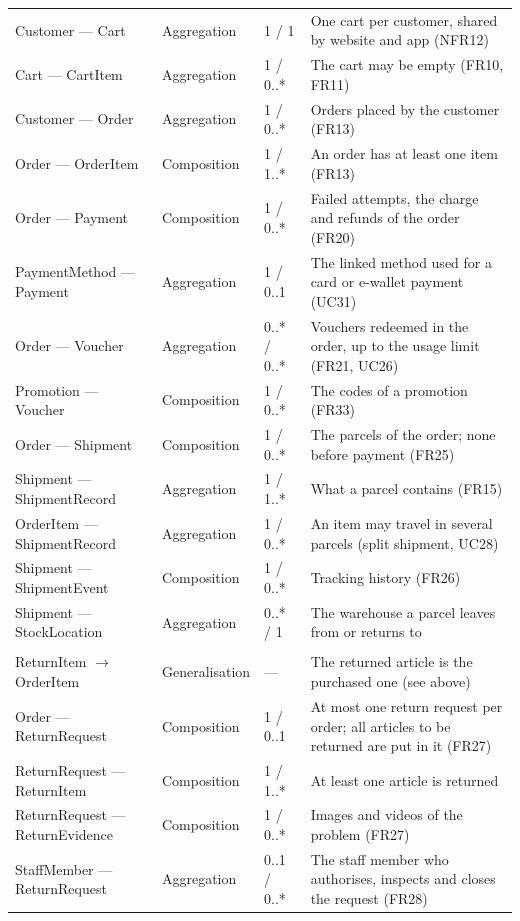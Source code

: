 {\begin{xltabular}{\textwidth}{@{}L{4.4cm} L{2.1cm} L{1.7cm} Y@{}}
Customer --- Cart & Aggregation & 1 / 1 & One cart per customer, shared by website and app (NFR12) \\
Cart --- CartItem & Aggregation & 1 / 0..* & The cart may be empty (FR10, FR11) \\
Customer --- Order & Aggregation & 1 / 0..* & Orders placed by the customer (FR13) \\
Order --- OrderItem & Composition & 1 / 1..* & An order has at least one item (FR13) \\
Order --- Payment & Composition & 1 / 0..* & Failed attempts, the charge and refunds of the order (FR20) \\
PaymentMethod --- Payment & Aggregation & 1 / 0..1 & The linked method used for a card or e-wallet payment (UC31) \\
Order --- Voucher & Aggregation & 0..* / 0..* & Vouchers redeemed in the order, up to the usage limit (FR21, UC26) \\
Promotion --- Voucher & Composition & 1 / 0..* & The codes of a promotion (FR33) \\
Order --- Shipment & Composition & 1 / 0..* & The parcels of the order; none before payment (FR25) \\
Shipment --- ShipmentRecord & Aggregation & 1 / 1..* & What a parcel contains (FR15) \\
OrderItem --- ShipmentRecord & Aggregation & 1 / 0..* & An item may travel in several parcels (split shipment, UC28) \\
Shipment --- ShipmentEvent & Composition & 1 / 0..* & Tracking history (FR26) \\
Shipment --- StockLocation & Aggregation & 0..* / 1 & The warehouse a parcel leaves from or returns to \\ \addlinespace
{} \\
ReturnItem $\rightarrow$ OrderItem & Generalisation & --- & The returned article is the purchased one (see above) \\
Order --- ReturnRequest & Composition & 1 / 0..1 & At most one return request per order; all articles to be returned are put in it (FR27) \\
ReturnRequest --- ReturnItem & Composition & 1 / 1..* & At least one article is returned \\
ReturnRequest --- ReturnEvidence & Composition & 1 / 0..* & Images and videos of the problem (FR27) \\
StaffMember --- ReturnRequest & Aggregation & 0..1 / 0..* & The staff member who authorises, inspects and closes the request (FR28) \\

\end{xltabular}}

